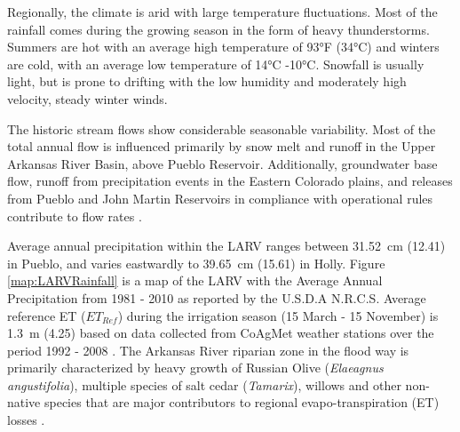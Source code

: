 \begin{linenumbers}[1]
Regionally, the climate is arid with large temperature fluctuations.  Most of the rainfall comes during the growing season in the form of heavy thunderstorms.  Summers are hot with an average high temperature of \ang{93}F (\ang{34}C) and winters are cold, with an average low temperature of \ang{14}C \ang{-10}C.  Snowfall is usually light, but is prone to drifting with the low humidity and moderately high velocity, steady winter winds.

The historic stream flows show considerable seasonable variability.  Most of the total annual flow is influenced primarily by snow melt and runoff in the Upper Arkansas River Basin, above Pueblo Reservoir.  Additionally, groundwater base flow, runoff from precipitation events in the Eastern Colorado plains, and releases from Pueblo and John Martin Reservoirs in compliance with operational rules contribute to flow rates \parencite{Miller2010}.

Average annual precipitation within the LARV ranges between \SI{31.52}{\centi\meter} (\SI{12.41}{\inch}) in Pueblo, and varies eastwardly to \SI{39.65}{\centi\meter} (\SI{15.61}{\inch}) in Holly.  Figure \ref{map:LARVRainfall} is a map of the LARV with the Average Annual Precipitation from 1981 - 2010 as reported by the U.S.D.A N.R.C.S.  Average reference ET ($ ET_{Ref} $) during the irrigation season (15 March - 15 November) is \SI{1.3}{\meter} (\SI{4.25}{\foot}) based on data collected from CoAgMet weather stations over the period 1992 - 2008 \parencite{clifford2009}.  The Arkansas River riparian zone in the flood way is primarily characterized by heavy growth of Russian Olive (\textit{Elaeagnus angustifolia}), multiple species of salt cedar (\textit{Tamarix}), willows and other non-native species that are major contributors to regional evapo-transpiration (ET) losses \parencite{Nagler2010a}.



\end{linenumbers}
